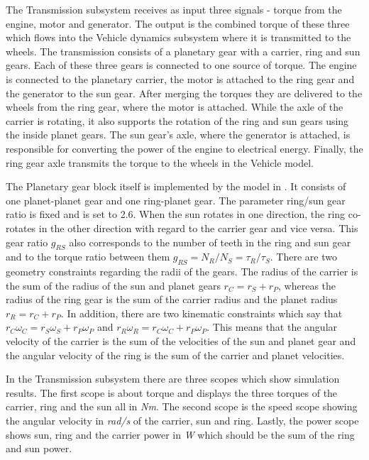 The Transmission subsystem receives as input three signals - torque from the engine, motor and generator. The output is the combined torque of these three which flows into the Vehicle dynamics subsystem where it is transmitted to the wheels. The transmission consists of a planetary gear with a carrier, ring and sun gears. Each of these three gears is connected to one source of torque. The engine is connected to the planetary carrier, the motor is attached to the ring gear and the generator to the sun gear. After merging the torques they are delivered to the wheels from the ring gear, where the motor is attached. While the axle of the carrier is rotating, it also supports the rotation of the ring and sun gears using the inside planet gears. The sun gear's axle, where the generator is attached, is responsible for converting the power of the engine to electrical energy. Finally, the ring gear axle transmits the torque to the wheels in the Vehicle model. 

The Planetary gear block itself is implemented by the model in \citet{planetMatlab}. It consists of one planet-planet gear and one ring-planet gear. The parameter ring/sun gear ratio is fixed and is set to 2.6. When the sun rotates in one direction, the ring co-rotates in the other direction with regard to the carrier gear and vice versa. This gear ratio $g_{RS}$ also corresponds to the number of teeth in the ring and sun gear and to the torque ratio between them $g_{RS} = N_R/N_S = \tau_R/\tau_S$. There are two geometry constraints regarding the radii of the gears. The radius of the carrier is the sum of the radius of the sun and planet gears $r_C = r_S + r_P$, whereas the radius of the ring gear is the sum of the carrier radius and the planet radius $r_R = r_C + r_P$. In addition, there are two kinematic constraints which say that $r_C\omega_C = r_S\omega_S + r_P\omega_P$ and $r_R\omega_R = r_C\omega_C + r_P\omega_P$. This means that the angular velocity of the carrier is the sum of the velocities of the sun and planet gear and the angular velocity of the ring is the sum of the carrier and planet velocities.

In the Transmission subsystem there are three scopes which show simulation results. The first scope is about torque and displays the three torques of the carrier, ring and the sun all in \textit{Nm}. The second scope is the speed scope showing the angular velocity in \textit{rad/s} of the carrier, sun and ring. Lastly, the power scope shows sun, ring and the carrier power in \textit{W} which should be the sum of the ring and sun power.

